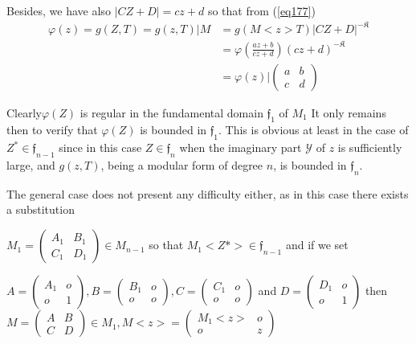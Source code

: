 Besides, we have also $|CZ + D| = cz + d$ so that from (\ref{eq177})
\begin{align*}
\varphi (z) = g(Z, T) = g(z, T) | M & = g (M <z> T) | CZ +
D|^{-\mathfrak{K}}\\ 
& = \varphi \left( \frac{az + b}{cz + d}\right) (cz + d)^{-
  \mathfrak{K}}\\ 
& = \varphi (z) \big| \begin{pmatrix} a & b \\ c & d \end{pmatrix}
\tag{178}\label{eq178} 
\end{align*}

Clearly\pageoriginale  $\varphi (Z)$ is regular in the fundamental domain
$\mathfrak{f}_1$ of $M_1$ It only remains then to verify that $\varphi
(Z)$ is bounded in $\mathfrak{f}_1$. This is obvious at least in the
case of $Z^* \in \mathfrak{f}_{n-1}$ since in this case $Z \in
\mathfrak{f}_n$ when the imaginary part $\mathscr{Y}$ of $z$ is
sufficiently large, and $g (z, T)$, being a modular form of degree
$n$, is bounded in $\mathfrak{f}_n$. 

The general case does not present any difficulty either, as in this
case there exists a substitution  

$M_1 = \begin{pmatrix} A_1 & B_1 \\ C_1 & D_1 \end{pmatrix} \in
M_{n-1}$ so that $M_1 <Z*> \in \mathfrak{f}_{n-1}$   
and if we set 

$A = \begin{pmatrix} A_1 & o \\ o & 1 \end{pmatrix},
B= \begin{pmatrix} B_1 & o \\ o & o \end{pmatrix}, C= \begin{pmatrix}
  C_1 & o \\ o & o \end{pmatrix} $ and $D = \begin{pmatrix} D_1 & o
  \\ o & 1 \end{pmatrix}$ 
 then $M = \begin{pmatrix} A & B \\ C & D \end{pmatrix} \in M_1,   M
 <z> = \begin{pmatrix} M_1 <z> & o \\ o & z \end{pmatrix}$  
 
